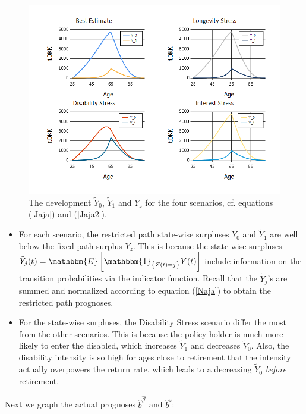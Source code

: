 \documentclass{article}
\newcommand{\1}[1]{\mathbbm{1}_{\left\lbrace #1 \right\rbrace}}
\newcommand{\expec}[1][def]{\mathbbm{E} \left[ #1 \right]}
\theoremstyle{break}
\theoremstyle{remark}
\numberwithin{equation}{section}
\begin{document}
\begin{figure}[H]
	\centering
	\caption{The development $\tilde{Y}_0$, $\tilde{Y}_1$ and $Y_z$ for the four scenarios, cf. equations (\ref{Jaja}) and (\ref{Jaja2}).}
	\includegraphics[width=\textwidth]{Reserves}
\end{figure}

\begin{itemize}
	\item For each scenario, the restricted path state-wise surpluses $\tilde{Y}_0$ and $\tilde{Y}_1$ are well below the fixed path surplus $Y_z$. This is because the state-wise surpluses $\tilde{Y}_j(t) = \expec[\1{Z(t)=j}Y(t)]$ include information on the transition probabilities via the indicator function. Recall that the $\tilde{Y}_j$'s are summed and normalized according to equation (\ref{Naja}) to obtain the restricted path prognoses.
	\item For the state-wise surpluses, the Disability Stress scenario differ the most from the other scenarios. This is because the policy holder is much more likely to enter the disabled, which increases $\tilde{Y}_1$ and decreases $\tilde{Y}_0$. Also, the disability intensity is so high for ages close to retirement that the intensity actually overpowers the return rate, which leads to a decreasing $\tilde{Y}_0$ \textit{before} retirement.
\end{itemize}

Next we graph the actual prognoses $\hat{b}^{\hat{\mathcal{J}}}$ and $\hat{b}^z$:
\end{document}
